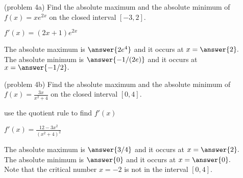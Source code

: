 \documentclass{ximera}
\begin{document}
\begin{problem}(problem 4a)
Find the absolute maximum and the absolute minimum of $f(x) = xe^{2x}$
on the closed interval $[-3, 2]$.
\begin{hint}
$f'(x) = (2x+1)e^{2x}$
\end{hint}

The absolute maximum is $\answer{2e^4}$ and it occurs at $x = \answer{2}.$\\
The absolute minimum is $\answer{-1/(2e)}$ and it occurs at $x = \answer{-1/2}.$ 
\end{problem}

\begin{problem}(problem 4b)
Find the absolute maximum and the absolute minimum of $f(x) = \frac{3x}{x^2+4}$
on the closed interval $[0, 4]$.

\begin{hint}
use the quotient rule to find $f'(x)$
\end{hint}
\begin{hint}
$f'(x) = \frac{12-3x^2}{(x^2+4)^2}$
\end{hint}

The absolute maximum is $\answer{3/4}$ and it occurs at $x = \answer{2}.$\\
The absolute minimum is $\answer{0}$ and it occurs at $x = \answer{0}.$\\
Note that the critical number $x= -2$ is not in the interval $[0, 4]$. 
\end{problem}


\begin{center}
\begin{foldable}
\end{foldable}
\end{center}
\end{document}
